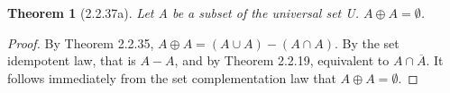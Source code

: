 \documentclass[a4paper, 12pt]{article}
\theoremstyle{plain}
\newtheorem*{theorem*}{Theorem}
\begin{document}
	
	\begin{theorem*}[2.2.37a]
		Let A be a subset of the universal set U. $A \oplus A = \emptyset$.
	\end{theorem*}
	
	\begin{proof}
		By Theorem 2.2.35, $A \oplus A = (A \cup A) - (A \cap A)$. By the set idempotent law, 
		that is $A - A$, and by Theorem 2.2.19, equivalent to $A \cap \overline{A}$. It follows 
		immediately from the set complementation law that $A \oplus A = \emptyset$.
	\end{proof}
\end{document}
